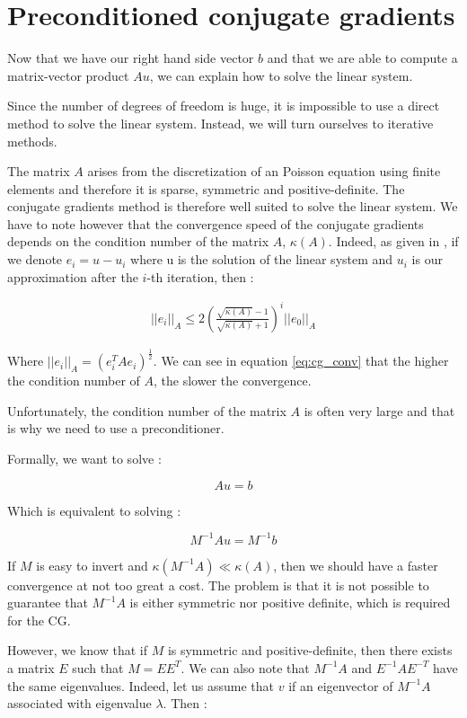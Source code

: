 \section{Preconditioned conjugate gradients}

Now that we have our right hand side vector $b$ and that we are able to compute a matrix-vector product $Au$, we can explain how to solve the linear system. 

Since the number of degrees of freedom is huge, it is impossible to use a direct method to solve the linear system. Instead, we will turn ourselves to iterative methods. 

The matrix $A$ arises from the discretization of an Poisson equation using finite elements and therefore it is sparse, symmetric and positive-definite. The conjugate gradients method is therefore well suited to solve the linear system. We have to note however that the convergence speed of the conjugate gradients depends on the condition number of the matrix $A$, $\kappa(A)$. Indeed, as given in \cite{conj_grad}, if we denote $e_i = u-u_i$ where u is the solution of the linear system and $u_i$ is our approximation after the $i$-th iteration, then : 

\begin{align}
||e_i||_A \leq 2 \left(\frac{\sqrt{\kappa(A)}-1}{\sqrt{\kappa(A)}+1}\right)^i ||e_0||_A \label{eq:cg_conv}
\end{align}


Where $||e_i||_A = \left(e_i^TAe_i\right)^\frac{1}{2}$. We can see in equation \ref{eq:cg_conv} that the higher the condition number of $A$, the slower the convergence.  

Unfortunately, the condition number of the matrix $A$ is often very large and that is why we need to use a preconditioner. 

Formally, we want to solve : 

$$Au=b$$

Which is equivalent to solving : 

$$M^{-1}A u = M^{-1}b$$

If $M$ is easy to invert and $\kappa(M^{-1}A) \ll \kappa(A)$, then we should have a faster convergence at not too great a cost. The problem is that it is not possible to guarantee that $M^{-1}A$ is either symmetric nor positive definite, which is required for the CG.

However, we know that if $M$ is symmetric and positive-definite, then there exists a matrix $E$ such that $M = EE^T$. We can also note that $M^{-1}A$ and $E^{-1}AE^{-T}$ have the same eigenvalues. Indeed, let us assume that $v$ if an eigenvector of $M^{-1}A$ associated with eigenvalue $\lambda$. Then :

